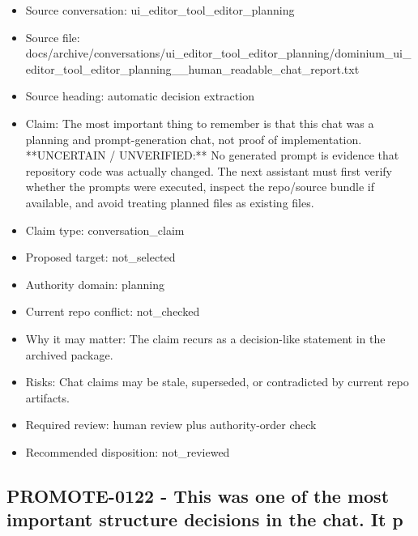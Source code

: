 \documentclass[11pt,a4paper]{report}
\begin{document}
\begin{itemize}
\item Source conversation: ui\_editor\_tool\_editor\_planning
\item Source file: docs/archive/conversations/ui\_editor\_tool\_editor\_planning/dominium\_ui\_editor\_tool\_editor\_planning\_\_human\_readable\_chat\_report.txt
\item Source heading: automatic decision extraction
\item Claim: The most important thing to remember is that this chat was a planning and prompt-generation chat, not proof of implementation. **UNCERTAIN / UNVERIFIED:** No generated prompt is evidence that repository code was actually changed. The next assistant must first verify whether the prompts were executed, inspect the repo/source bundle if available, and avoid treating planned files as existing files.
\item Claim type: conversation\_claim
\item Proposed target: not\_selected
\item Authority domain: planning
\item Current repo conflict: not\_checked
\item Why it may matter: The claim recurs as a decision-like statement in the archived package.
\item Risks: Chat claims may be stale, superseded, or contradicted by current repo artifacts.
\item Required review: human review plus authority-order check
\item Recommended disposition: not\_reviewed
\end{itemize}

\subsection{PROMOTE-0122 - This was one of the most important structure decisions in the chat. It p}
\end{document}
